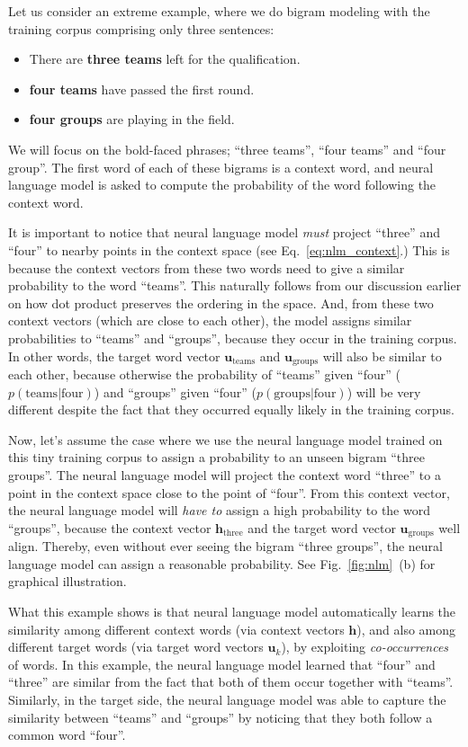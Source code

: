 \documentclass{report}
\newcommand{\vect}[1]{\mathbf{#1}}
\newcommand{\vh}[0]{\vect{h}}
\newcommand{\vu}[0]{\vect{u}}
\begin{document}
Let us consider an extreme example, where we do bigram modeling with the
training corpus comprising only three sentences:
\begin{itemize}
    \itemsep 0em
    \item There are \textbf{three teams} left for the qualification.
    \item \textbf{four teams} have passed the first round.
    \item \textbf{four groups} are playing in the field.
\end{itemize}
We will focus on the bold-faced phrases; ``three teams'', ``four teams'' and
``four group''. The first word of each of these bigrams is a context word, and
neural language model is asked to compute the probability of the word following
the context word.

It is important to notice that neural language model {\em must} project
``three'' and ``four'' to nearby points in the context space (see
Eq.~\eqref{eq:nlm_context}.) This is because the context vectors from these two
words need to give a similar probability to the word ``teams''. This naturally
follows from our discussion earlier on how dot product preserves the ordering in
the space. And, from these two context vectors (which are close to each other),
the model assigns similar probabilities to ``teams'' and ``groups'', because
they occur in the training corpus. In other words, the target word vector
$\vu_{\text{teams}}$ and $\vu_{\text{groups}}$ will also be similar to each
other, because otherwise the probability of ``teams'' given ``four''
($p(\text{teams} | \text{four})$) and
``groups'' given ``four'' ($p(\text{groups} | \text{four})$) will be very
different despite the fact that they occurred equally likely in the training
corpus.

Now, let's assume the case where we use the neural language model trained on
this tiny training corpus to assign a probability to an unseen bigram ``three
groups''. The neural language model will project the context word ``three'' to a
point in the context space close to the point of ``four''. From this context
vector, the neural language model will {\em have to} assign a high probability
to the word ``groups'', because the context vector $\vh_{\text{three}}$ and the
target word vector $\vu_{\text{groups}}$ well align. Thereby, even without ever
seeing the bigram ``three groups'', the neural language model can assign a
reasonable probability. See Fig.~\ref{fig:nlm}~(b) for graphical
illustration.

What this example shows is that neural language model automatically learns the
similarity among different context words (via context vectors $\vh$), and also among
different target words (via target word vectors $\vu_k$), by exploiting {\em
co-occurrences} of words. In this example, the neural language model learned
that ``four'' and ``three'' are similar from the fact that both of them occur
together with ``teams''. Similarly, in the target side, the neural language
model was able to capture the similarity between ``teams'' and ``groups'' by
noticing that they both follow a common word ``four''.
\end{document}

